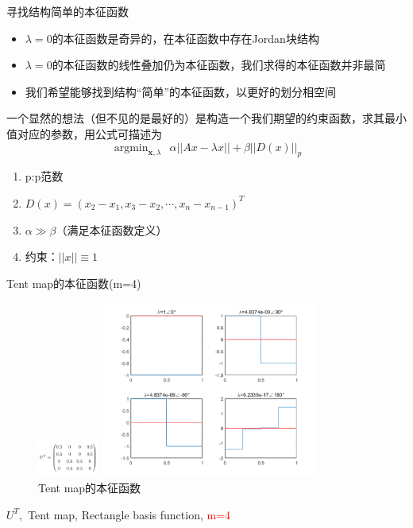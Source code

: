 \documentclass{beamer}
\begin{document}
\begin{frame}{寻找结构简单的本征函数}
\small
\begin{itemize}
	\item $\lambda=0$的本征函数是奇异的，在本征函数中存在Jordan块结构
	\item $\lambda=0$的本征函数的线性叠加仍为本征函数，我们求得的本征函数并非最简
	\item 我们希望能够找到结构“简单”的本征函数，以更好的划分相空间
\end{itemize}
	一个显然的想法（但不见的是最好的）是构造一个我们期望的约束函数，求其最小值对应的参数，用公式可描述为$$\mathop{\arg\min}_{\boldsymbol{x},\lambda} \ \ \alpha || Ax-\lambda x || + \beta ||D(x)||_p$$
	\begin{enumerate}
		\item p:p范数
		\item $D(x)=(x_2-x_1,x_3-x_2,\cdots,x_n-x_{n-1})^T$
		\item $\alpha \gg \beta$（满足本征函数定义）
		\item 约束：$||x||\equiv 1$
	\end{enumerate}
\end{frame}

\begin{frame}{Tent map的本征函数(m=4)}
\begin{figure}
	\begin{minipage}{0.2\linewidth}
		\centering
		\includegraphics[width=0.8in]{figure/tent_m4_matrix}
		\caption{Koopman算符的矩阵表示(m=4)}
	\end{minipage}
	\begin{minipage}{0.6\linewidth}
		\centering
		\includegraphics[width=2.8in]{figure/tent_m4_eigen}
		\caption{Tent map的本征函数}
	\end{minipage}
\end{figure}
\centering
$U^T,$ Tent map, Rectangle basis function, \textcolor{red}{m=4}
\end{frame}
\end{document}
